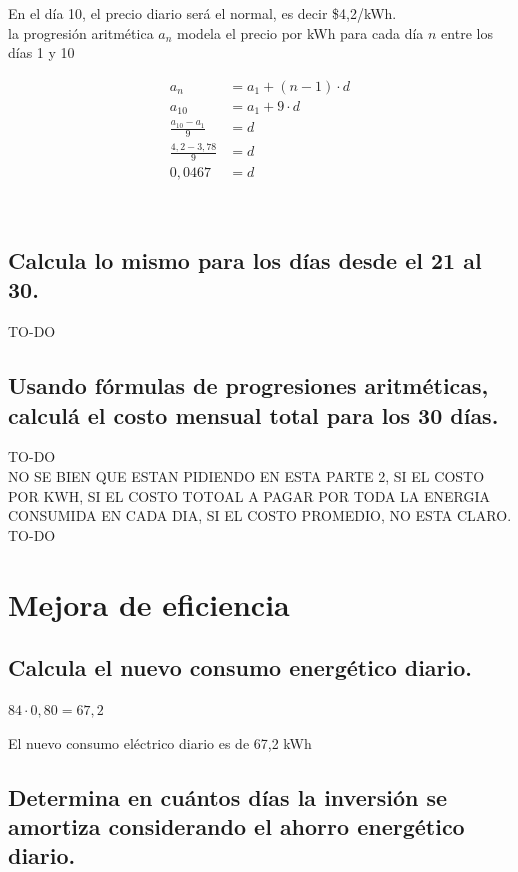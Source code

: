 \documentclass[11pt, a4paper]{article}
\begin{document}
En el día 10, el precio diario será el normal, es decir \$4,2/kWh. \\

la progresión aritmética $a_n$ modela el precio por kWh para cada día $n$ entre los días 1 y 10

\begin{align*}
a_n &= a_1 + (n-1) \cdot d \\
a_{10} &= a_1 + 9 \cdot d\\
\frac{a_{10}-a_1}{9} &= d\\
\frac{4,2-3,78}{9} &= d \\
\boxed{0,0467} &= d
\end{align*}

{ \\}

\subsection{Calcula lo mismo para los días desde el 21 al 30.}
{\color{red}TO-DO}

\subsection{Usando fórmulas de progresiones aritméticas, calculá el costo mensual total para los 30 días.}
{\color{red}TO-DO}\\

{\color{red} NO SE BIEN QUE ESTAN PIDIENDO EN ESTA PARTE 2, SI EL COSTO POR KWH, SI EL COSTO TOTOAL A PAGAR POR TODA LA ENERGIA CONSUMIDA EN CADA DIA, SI EL COSTO PROMEDIO, NO ESTA CLARO. TO-DO}

\section{Mejora de eficiencia}

\subsection{Calcula el nuevo consumo energético diario.}

$84 \cdot 0,80 = 67,2$

El nuevo consumo eléctrico diario es de 67,2 kWh

\subsection{Determina en cuántos días la inversión se amortiza considerando el ahorro energético diario.}
\end{document}
